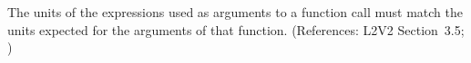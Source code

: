 The units of the expressions used as arguments to a function call
must match the units expected for the arguments of that function.
(References: L2V2 Section~3.5; )
